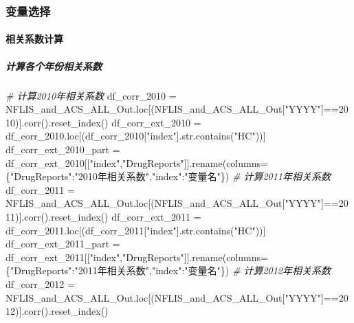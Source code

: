 \documentclass[
]{article}
\newenvironment{Shaded}{}{}
\newcommand{\BuiltInTok}[1]{#1}
\newcommand{\CommentTok}[1]{\textcolor[rgb]{0.38,0.63,0.69}{\textit{#1}}}
\newcommand{\DecValTok}[1]{\textcolor[rgb]{0.25,0.63,0.44}{#1}}
\newcommand{\NormalTok}[1]{#1}
\newcommand{\OperatorTok}[1]{\textcolor[rgb]{0.40,0.40,0.40}{#1}}
\newcommand{\StringTok}[1]{\textcolor[rgb]{0.25,0.44,0.63}{#1}}
\begin{document}
\hypertarget{header-n262}{%
\subsubsection{变量选择}\label{header-n262}}

\hypertarget{header-n263}{%
\paragraph{相关系数计算}\label{header-n263}}

\hypertarget{header-n264}{%
\subparagraph{计算各个年份相关系数}\label{header-n264}}

\begin{Shaded}
\begin{Highlighting}[]
\CommentTok{\# 计算2010年相关系数}
\NormalTok{df\_corr\_2010 }\OperatorTok{=}\NormalTok{ NFLIS\_and\_ACS\_ALL\_Out.loc[(NFLIS\_and\_ACS\_ALL\_Out[}\StringTok{"YYYY"}\NormalTok{]}\OperatorTok{==}\DecValTok{2010}\NormalTok{)].corr().reset\_index()}
\NormalTok{df\_corr\_ext\_2010 }\OperatorTok{=}\NormalTok{ df\_corr\_2010.loc[(df\_corr\_2010[}\StringTok{"index"}\NormalTok{].}\BuiltInTok{str}\NormalTok{.contains(}\StringTok{"HC"}\NormalTok{))]}
\NormalTok{df\_corr\_ext\_2010\_part }\OperatorTok{=}\NormalTok{ df\_corr\_ext\_2010[[}\StringTok{"index"}\NormalTok{,}\StringTok{"DrugReports"}\NormalTok{]].rename(columns}\OperatorTok{=}\NormalTok{\{}\StringTok{"DrugReports"}\NormalTok{:}\StringTok{"2010年相关系数"}\NormalTok{,}\StringTok{"index"}\NormalTok{:}\StringTok{"变量名"}\NormalTok{\})}
\CommentTok{\# 计算2011年相关系数}
\NormalTok{df\_corr\_2011 }\OperatorTok{=}\NormalTok{ NFLIS\_and\_ACS\_ALL\_Out.loc[(NFLIS\_and\_ACS\_ALL\_Out[}\StringTok{"YYYY"}\NormalTok{]}\OperatorTok{==}\DecValTok{2011}\NormalTok{)].corr().reset\_index()}
\NormalTok{df\_corr\_ext\_2011 }\OperatorTok{=}\NormalTok{ df\_corr\_2011.loc[(df\_corr\_2011[}\StringTok{"index"}\NormalTok{].}\BuiltInTok{str}\NormalTok{.contains(}\StringTok{"HC"}\NormalTok{))]}
\NormalTok{df\_corr\_ext\_2011\_part }\OperatorTok{=}\NormalTok{ df\_corr\_ext\_2011[[}\StringTok{"index"}\NormalTok{,}\StringTok{"DrugReports"}\NormalTok{]].rename(columns}\OperatorTok{=}\NormalTok{\{}\StringTok{"DrugReports"}\NormalTok{:}\StringTok{"2011年相关系数"}\NormalTok{,}\StringTok{"index"}\NormalTok{:}\StringTok{"变量名"}\NormalTok{\})}
\CommentTok{\# 计算2012年相关系数}
\NormalTok{df\_corr\_2012 }\OperatorTok{=}\NormalTok{ NFLIS\_and\_ACS\_ALL\_Out.loc[(NFLIS\_and\_ACS\_ALL\_Out[}\StringTok{"YYYY"}\NormalTok{]}\OperatorTok{==}\DecValTok{2012}\NormalTok{)].corr().reset\_index()}

\end{Highlighting}
\end{Shaded}
\end{document}
